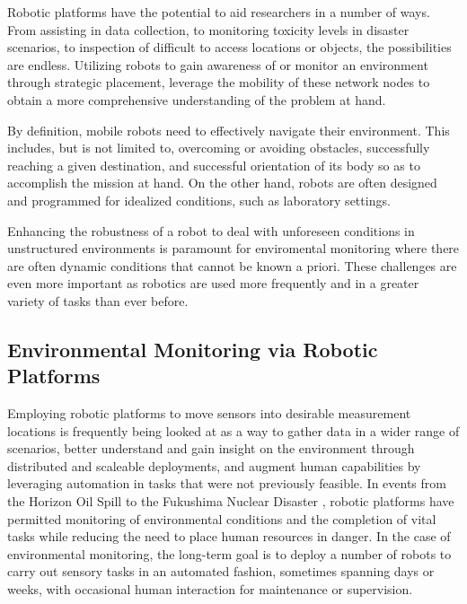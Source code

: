 	Robotic platforms have the potential to aid researchers in a number of ways.  From assisting in data collection, to monitoring toxicity levels in disaster scenarios, to inspection of difficult to access locations or objects, the possibilities are endless. Utilizing robots to gain awareness of or monitor an environment through strategic placement, leverage the mobility of these network nodes to obtain a more comprehensive understanding of the problem at hand. 


	By definition, mobile robots need to effectively navigate their environment.  This includes, but is not limited to, overcoming or avoiding obstacles, successfully reaching a given destination, and successful orientation of its body so as to accomplish the mission at hand. On the other hand, robots are often designed and programmed for idealized conditions, such as laboratory settings. 

	Enhancing the robustness of a robot to deal with unforeseen conditions in unstructured environments is paramount for enviromental monitoring where there are often dynamic conditions that cannot be known a priori. These challenges are even more important as robotics are used more frequently and in a greater variety of tasks than ever before.

	\subsection{Environmental Monitoring via Robotic Platforms}%


		Employing robotic platforms to move sensors into desirable measurement locations is frequently being looked at as a way to gather data in a wider range of scenarios, better understand and gain insight on the environment through distributed and scaleable deployments, and augment human capabilities by leveraging automation in tasks that were not previously feasible. In events from the Horizon Oil Spill \cite{dssoa} to the Fukushima Nuclear Disaster \cite{Hasegawa2012}, robotic platforms have permitted monitoring of environmental conditions and the completion of vital tasks while reducing the need to place human resources in danger. In the case of environmental monitoring, the long-term goal is to deploy a number of robots to carry out sensory tasks in an automated fashion, sometimes spanning days or weeks, with occasional human interaction for maintenance or supervision.

